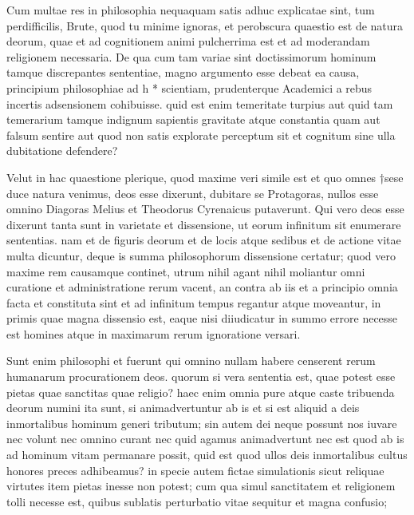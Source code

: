 
 Cum multae res in philosophia nequaquam satis adhuc explicatae sint, tum perdifficilis, Brute, quod tu minime ignoras, et perobscura quaestio est de natura deorum, quae et ad cognitionem animi pulcherrima est et ad moderandam religionem necessaria. De qua cum tam variae sint doctissimorum hominum tamque discrepantes sententiae, magno argumento esse debeat ea causa, principium philosophiae ad h * scientiam, prudenterque Academici a rebus incertis adsensionem cohibuisse. quid est enim temeritate turpius aut quid tam temerarium tamque indignum sapientis gravitate atque constantia quam aut falsum sentire aut quod non satis explorate perceptum sit et cognitum sine ulla dubitatione defendere?

 Velut in hac quaestione plerique, quod maxime veri simile est et quo omnes †sese duce natura venimus, deos esse dixerunt, dubitare se Protagoras, nullos esse omnino Diagoras Melius et Theodorus Cyrenaicus putaverunt. Qui vero deos esse dixerunt tanta sunt in varietate et dissensione, ut eorum infinitum sit enumerare sententias. nam et de figuris deorum et de locis atque sedibus et de actione vitae multa dicuntur, deque is summa philosophorum dissensione certatur; quod vero maxime rem causamque continet, utrum nihil agant nihil moliantur omni curatione et administratione rerum vacent, an contra ab iis et a principio omnia facta et constituta sint et ad infinitum tempus regantur atque moveantur, in primis quae magna dissensio est, eaque nisi diiudicatur in summo errore necesse est homines atque in maximarum rerum ignoratione versari.

 Sunt enim philosophi et fuerunt qui omnino nullam habere censerent rerum humanarum procurationem deos. quorum si vera sententia est, quae potest esse pietas quae sanctitas quae religio? haec enim omnia pure atque caste tribuenda deorum numini ita sunt, si animadvertuntur ab is et si est aliquid a deis inmortalibus hominum generi tributum; sin autem dei neque possunt nos iuvare nec volunt nec omnino curant nec quid agamus animadvertunt nec est quod ab is ad hominum vitam permanare possit, quid est quod ullos deis inmortalibus cultus honores preces adhibeamus? in specie autem fictae simulationis sicut reliquae virtutes item pietas inesse non potest; cum qua simul sanctitatem et religionem tolli necesse est, quibus sublatis perturbatio vitae sequitur et magna confusio;


